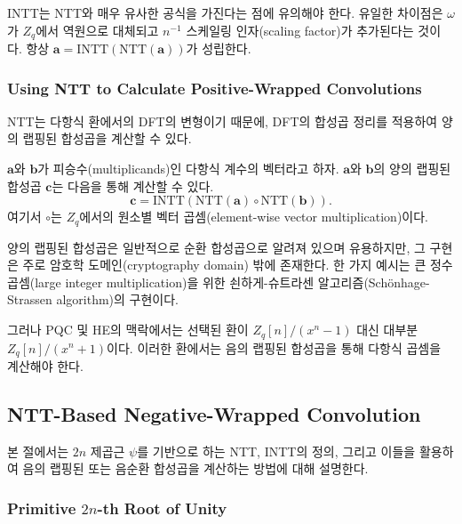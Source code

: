 INTT는 NTT와 매우 유사한 공식을 가진다는 점에 유의해야 한다. 유일한 차이점은 $\omega$가 $Z_q$에서 역원으로 대체되고 $n^{-1}$ 스케일링 인자(scaling factor)가 추가된다는 것이다. 항상 $\mathbf{a} = \text{INTT}(\text{NTT}(\mathbf{a}))$가 성립한다.

\subsubsection{Using NTT to Calculate Positive-Wrapped Convolutions}

NTT는 다항식 환에서의 DFT의 변형이기 때문에, DFT의 합성곱 정리를 적용하여 양의 랩핑된 합성곱을 계산할 수 있다.

\begin{tcolorbox}[colback=white, boxrule=0.7pt, sharp corners]
\begin{proposition}
$\mathbf{a}$와 $\mathbf{b}$가 피승수(multiplicands)인 다항식 계수의 벡터라고 하자. $\mathbf{a}$와 $\mathbf{b}$의 양의 랩핑된 합성곱 $\mathbf{c}$는 다음을 통해 계산할 수 있다.
\begin{equation}
    \mathbf{c} = \text{INTT}(\text{NTT}(\mathbf{a}) \circ \text{NTT}(\mathbf{b})).
\end{equation}
여기서 $\circ$는 $Z_q$에서의 원소별 벡터 곱셈(element-wise vector multiplication)이다.
\end{proposition}
\end{tcolorbox}

양의 랩핑된 합성곱은 일반적으로 순환 합성곱으로 알려져 있으며 유용하지만, 그 구현은 주로 암호학 도메인(cryptography domain) 밖에 존재한다. 한 가지 예시는 큰 정수 곱셈(large integer multiplication)을 위한 쇤하게-슈트라센 알고리즘(Schönhage-Strassen algorithm)의 구현이다.

그러나 PQC 및 HE의 맥락에서는 선택된 환이 $Z_q[n]/(x^n - 1)$ 대신 대부분 $Z_q[n]/(x^n + 1)$이다. 이러한 환에서는 음의 랩핑된 합성곱을 통해 다항식 곱셈을 계산해야 한다.

\subsection{NTT-Based Negative-Wrapped Convolution}

본 절에서는 $2n$ 제곱근 $\psi$를 기반으로 하는 NTT, INTT의 정의, 그리고 이들을 활용하여 음의 랩핑된 또는 음순환 합성곱을 계산하는 방법에 대해 설명한다.

\subsubsection{Primitive $2n$-th Root of Unity}

